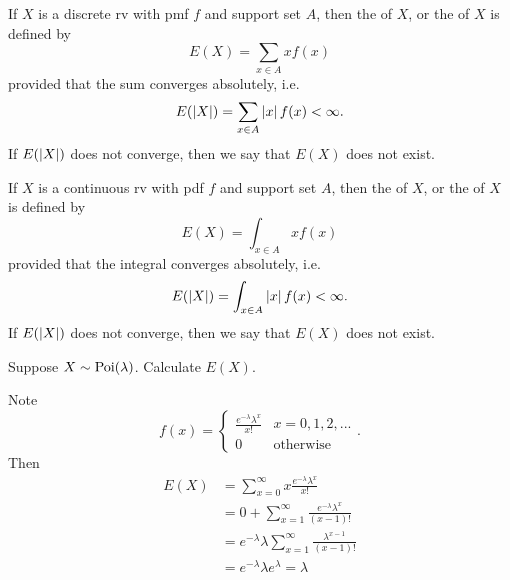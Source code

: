 \documentclass[notoc,notitlepage]{tufte-book}
\begin{document}
\begin{defn}
\label{defn:expectation_of_a_discrete_rv}
  If $X$ is a discrete rv with pmf $f$ and support set $A$, then the  of $X$, or the  of $X$ is defined by
  \begin{equation}\label{eq:expectation_discrete}
    E(X) = \sum_{x \in A} x f(x)
  \end{equation}
  provided that the sum converges absolutely, i.e.
  \begin{equation*}
    E(\left|X\right|) = \sum_{x \in A} \left|x\right| f(x) < \infty.
  \end{equation*}
  If $E(\left|X\right|)$ does not converge, then we say that $E(X)$ does not exist.
\end{defn}

\begin{defn}
\label{defn:expectation_of_a_continuous_rv}
  If $X$ is a continuous rv with pdf $f$ and support set $A$, then the  of $X$, or the  of $X$ is defined by
  \begin{equation}\label{eq:expectation_continuous}
    E(X) = \int_{x \in A} x f(x)
  \end{equation}
  provided that the integral converges absolutely, i.e.
  \begin{equation*}
    E(\left|X\right|) = \int_{x \in A} \left|x\right| f(x) < \infty.
  \end{equation*}
  If $E(\left|X\right|)$ does not converge, then we say that $E(X)$ does not exist.
\end{defn}

\begin{eg}[Example 2.16]
  Suppose $X \sim \operatorname{Poi}(\lambda)$. Calculate $E(X)$.

  \begin{solution}
    Note
    \begin{equation*}
      f(x) = \begin{cases}
        \frac{e^{- \lambda} \lambda^x}{x!}  & x = 0, 1, 2, ... \\
        0                                   & \text{otherwise}
      \end{cases}.
    \end{equation*}
    Then
    \begin{align*}
      E(X) &= \sum_{x = 0}^{\infty} x \frac{e^{-\lambda} \lambda^x}{x!} \\
           &= 0 + \sum_{x = 1}^{\infty} \frac{e^{-\lambda} \lambda^x}{(x - 1)!} \\
           &= e^{-\lambda} \lambda \sum_{x = 1}^{\infty} \frac{\lambda^{x - 1}}{(x - 1)!} \\
           &= e^{-\lambda} \lambda e^{\lambda} = \lambda
    \end{align*}
  \end{solution}
\end{eg}
\end{document}
